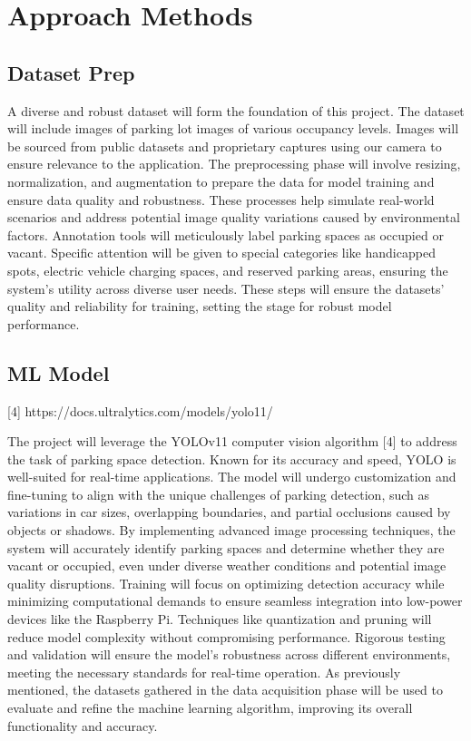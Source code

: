 \documentclass[conference]{IEEEtran}
\begin{document}
\section{Approach Methods}

\subsection{Dataset Prep}

A diverse and robust dataset will form the foundation of this project. 
The dataset will include images of parking lot images of various occupancy levels. 
Images will be sourced from public datasets and proprietary captures using our camera to ensure relevance to the application. 
The preprocessing phase will involve resizing, 
normalization, 
and augmentation to prepare the data for model training and ensure data quality and robustness. 
These processes help simulate real-world scenarios and address potential image quality variations caused by environmental factors. 
Annotation tools will meticulously label parking spaces as occupied or vacant. 
Specific attention will be given to special categories like handicapped spots, 
electric vehicle charging spaces, 
and reserved parking areas, 
ensuring the system’s utility across diverse user needs. 
These steps will ensure the datasets’ quality and reliability for training, 
setting the stage for robust model performance.

\subsection{ML Model}

[4] https://docs.ultralytics.com/models/yolo11/

The project will leverage the YOLOv11 computer vision algorithm [4] to address the task of parking space detection. 
Known for its accuracy and speed, 
YOLO is well-suited for real-time applications.
The model will undergo customization and fine-tuning to align with the unique challenges of parking detection, 
such as variations in car sizes, 
overlapping boundaries, 
and partial occlusions caused by objects or shadows. 
By implementing advanced image processing techniques, 
the system will accurately identify parking spaces and determine whether they are vacant or occupied, 
even under diverse weather conditions and potential image quality disruptions. 
Training will focus on optimizing detection accuracy while minimizing computational demands to ensure seamless integration into low-power devices like the Raspberry Pi. 
Techniques like quantization and pruning will reduce model complexity without compromising performance. 
Rigorous testing and validation will ensure the model’s robustness across different environments, 
meeting the necessary standards for real-time operation. 
As previously mentioned, 
the datasets gathered in the data acquisition phase will be used to evaluate and refine the machine learning algorithm, 
improving its overall functionality and accuracy.
\end{document}
